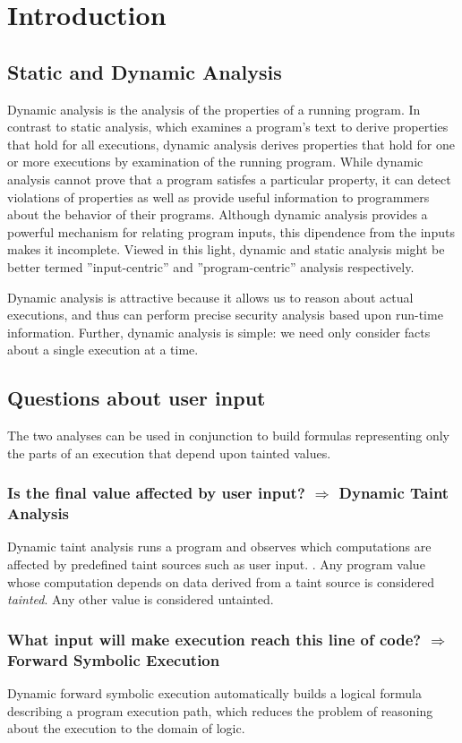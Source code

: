 \section{Introduction}
\subsection{Static and Dynamic Analysis} 
Dynamic analysis is the analysis of the properties of a running program. In contrast to static analysis, which examines a program's text to derive properties that hold for all executions, dynamic analysis derives properties that hold for one or more executions by examination of the running program. While dynamic analysis cannot prove that a program satisfes a particular property, it can detect violations of properties as well as provide useful information to programmers about the behavior of their programs. Although dynamic analysis provides a powerful mechanism for relating program inputs, this dipendence from the inputs makes it incomplete. Viewed in this light, dynamic and static analysis might be better termed ''input-centric'' and ''program-centric'' analysis respectively. \cite{ball1999concept}

Dynamic analysis is attractive because it allows us to reason about actual executions, and thus can perform precise security analysis based upon run-time information. Further, dynamic analysis is simple: we need only consider facts about a single execution at a time. 

\subsection{Questions about user input}
The two analyses can be used in conjunction to build formulas representing only the parts of an execution that depend upon tainted values.

\subsubsection{Is the final value affected by user input? $\Rightarrow$ Dynamic Taint Analysis}
Dynamic taint analysis runs a program and observes which computations are affected by predefined taint sources such as user input. . Any program value whose computation depends on data derived from a taint source is considered \textit{tainted}. Any other value is considered untainted.

\subsubsection{What input will make execution reach this line of code? $\Rightarrow$ Forward Symbolic Execution}
Dynamic forward symbolic execution automatically builds a logical formula describing a program execution path, which reduces the problem of reasoning about the execution to the domain of logic.

